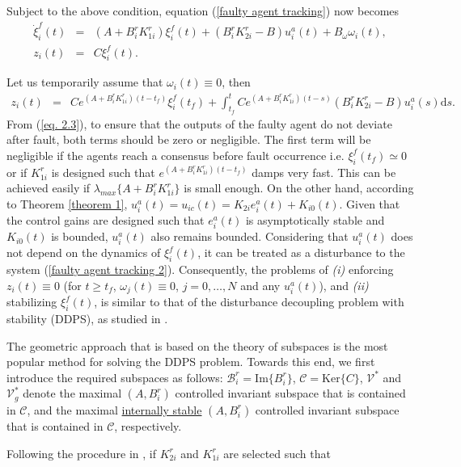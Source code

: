\documentclass[12pt,draftcls,onecolumn]{IEEEtran}
\begin{document}
 Subject to the above condition, equation (\ref{faulty agent tracking}) now becomes
\begin{eqnarray}
\dot {\xi}_i^f(t)&=&(A+B_i^rK_{1i}^{r})\xi_i^f(t)+(B_i^rK_{2i}^{r}-B)u_i^a(t)+B_{\omega}\omega_i(t),\label{faulty agent tracking 2}\\
z_i(t)&=&C\xi_i^f(t).\nonumber
\end{eqnarray}\par
 Let us  temporarily assume that  $\omega_i(t)\equiv 0$, then
 \begin{eqnarray}
 z_i(t)&=&Ce^{(A+B_i^rK_{1i}^{r})(t-t_f)}\xi_i^f(t_f)+\int_{t_f}^tCe^{(A+B_i^rK_{1i}^{r})(t-s)}(B_i^rK_{2i}^{r}-B)u_i^a(s)\text{d}s.\label{eq. 2.3}
 \end{eqnarray}
{ From (\ref{eq. 2.3}), to ensure that the outputs of the faulty agent do not deviate after fault, both terms should be zero or negligible. The first term will be negligible if the agents reach a consensus before fault occurrence i.e. $\xi_i^f(t_f)\simeq 0$ or if  $K_{1i}^{r}$ is designed such that  $e^{(A+B_i^rK_{1i}^{r})(t-t_f)}$ damps very fast.  This can be  achieved easily if $\lambda_{max}\{A+B_i^rK_{1i}^{r}\}$ is small enough. }
On the other hand,   according to Theorem \ref{theorem 1}, $u_i^a(t)=u_{ic}(t)=K_{2i}e_i^a(t)+K_{i0}(t)$. Given that the control gains are designed such that $e_i^a(t)$ is asymptotically stable and $K_{i0}(t)$ is bounded,  $u_i^a(t)$ also remains bounded.  Considering that $u_i^a(t)$ does not depend on the dynamics of $\xi_i^f(t)$, it can be treated as a disturbance to the system (\ref{faulty agent tracking 2}).  
Consequently, the problems of \emph{(i)} enforcing $z_i(t)\equiv 0$ (for $t\geq t_f$, $\omega_j(t)\equiv 0$, $j=0,\dots,N$ and any $u_i^a(t)$), and \emph{(ii)} stabilizing  $\xi_i^f(t)$,  is similar to that of the disturbance decoupling problem with stability (DDPS), as studied in \cite{Lunze2006}. \par
 The geometric approach that is based on the  theory of subspaces \cite{Basile92} is the most popular method for solving the DDPS problem. Towards this end, we first  introduce the required subspaces as follows:
 $\mathcal{B}_i^r=\text{Im}\{B_i^r\}$, $\mathcal{C}=\text{Ker}\{C\}$, $\mathcal{V}^*$ and $\mathcal{V}_g^*$ denote the maximal $(A,B_i^r)$ controlled invariant  subspace that is contained in $\mathcal{C}$, and the maximal \underline{ internally stable} $(A,B_i^r)$ controlled invariant  subspace that is contained in $\mathcal{C}$, respectively. \par
 Following the procedure in \cite{Basile92}, if $K_{2i}^{r}$ and $K_{1i}^r$ are selected such that 
\end{document}
